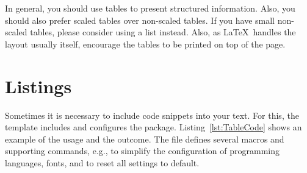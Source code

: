 \begin{MySugg}
	In general, you should use tables to present structured information. Also, you should also prefer scaled tables over non-scaled tables. If you have small non-scaled tables, please consider using a list instead. Also, as \LaTeX\ handles the layout usually itself, encourage the tables to be printed on top of the page.
\end{MySugg}

\section{Listings}
\label{sec:2:Listings}
Sometimes it is necessary to include code snippets into your text. For this, the template includes and configures the  package. Listing~\ref{lst:TableCode} shows an example of the usage and the outcome. The file  defines several macros and supporting commands, e.g., to simplify the configuration of programming languages, fonts, and to reset all settings to default.

